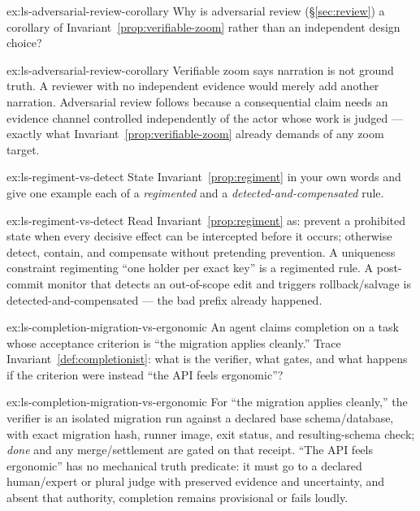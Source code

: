 \documentclass[11pt,a4paper]{article}
\theoremstyle{definition}
\theoremstyle{plain}
\begin{document}
\begin{pdexercise}[kind=Check,rating=1]{ex:ls-adversarial-review-corollary}
Why is adversarial review (\S\ref{sec:review}) a corollary of
Invariant~\ref{prop:verifiable-zoom} rather than an independent design choice?
\end{pdexercise}
\begin{pdsolution}{ex:ls-adversarial-review-corollary}
Verifiable zoom says narration is not ground truth. A reviewer with no independent evidence would merely add another narration. Adversarial review follows because a consequential claim needs an evidence channel controlled independently of the actor whose work is judged --- exactly what Invariant~\ref{prop:verifiable-zoom} already demands of any zoom target.
\end{pdsolution}
\begin{pdexercise}[kind=Check,rating=1]{ex:ls-regiment-vs-detect}
State Invariant~\ref{prop:regiment} in your own words and give one example each of a
\emph{regimented} and a \emph{detected-and-compensated} rule.
\end{pdexercise}
\begin{pdsolution}{ex:ls-regiment-vs-detect}
Read Invariant~\ref{prop:regiment} as: prevent a prohibited state when every decisive effect can be intercepted before it occurs; otherwise detect, contain, and compensate without pretending prevention. A uniqueness constraint regimenting ``one holder per exact key'' is a regimented rule. A post-commit monitor that detects an out-of-scope edit and triggers rollback/salvage is detected-and-compensated --- the bad prefix already happened.
\end{pdsolution}
\begin{pdexercise}[kind=Trace,rating=2]{ex:ls-completion-migration-vs-ergonomic}
An agent claims completion on a task whose acceptance criterion is ``the
migration applies cleanly.'' Trace Invariant~\ref{def:completionist}: what is the
verifier, what gates, and what happens if the criterion were instead ``the API feels
ergonomic''?
\end{pdexercise}
\begin{pdsolution}{ex:ls-completion-migration-vs-ergonomic}
For ``the migration applies cleanly,'' the verifier is an isolated migration run against a declared base schema/database, with exact migration hash, runner image, exit status, and resulting-schema check; \emph{done} and any merge/settlement are gated on that receipt. ``The API feels ergonomic'' has no mechanical truth predicate: it must go to a declared human/expert or plural judge with preserved evidence and uncertainty, and absent that authority, completion remains provisional or fails loudly.
\end{pdsolution}
\end{document}
